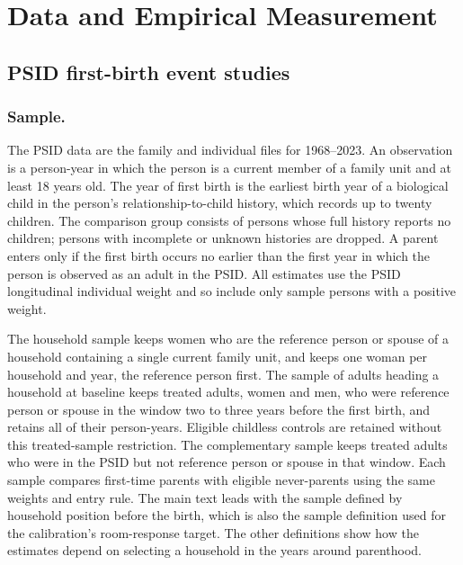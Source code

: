 \appendix


\section{Data and Empirical Measurement}
\label{app:empirical-data}

\subsection{PSID first-birth event studies}

\subsubsection*{Sample.}
The PSID data are the family and individual files for 1968--2023. An
observation is a person-year in which the person is a current member of a
family unit and at least 18 years old. The year of first birth is the earliest
birth year of a biological child in the person's relationship-to-child
history, which records up to twenty children. The comparison group consists of
persons whose full history reports no children; persons with incomplete or
unknown histories are dropped. A parent enters only if the first birth
occurs no earlier than the first year in which the person is observed as an
adult in the PSID. All estimates use the PSID longitudinal individual weight
and so include only sample persons with a positive weight.

The household sample keeps women who are the reference person or spouse of a
household containing a single current family unit, and keeps one woman per
household and year, the reference person first. The sample of adults heading a
household at baseline keeps treated adults, women and men, who were reference
person or spouse in the window two to three years before the first birth, and
retains all of their person-years. Eligible childless controls are retained
without this treated-sample restriction. The complementary sample keeps
treated adults who
were in the PSID but not reference person or spouse in that window. Each
sample compares first-time parents with eligible never-parents using the
same weights and entry rule. The main
text leads with the sample defined by household position before the birth,
which is also the sample definition used for the calibration's room-response
target. The other definitions show how the estimates depend on selecting a
household in the years around parenthood.


